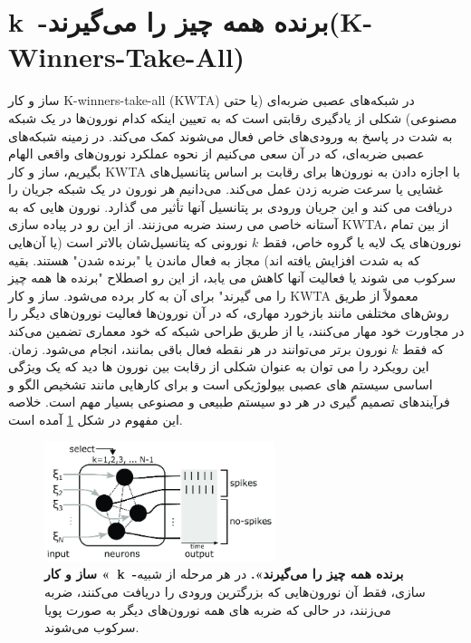 \section{k~-برنده همه چیز را می‌گیرند(K-Winners-Take-All)}
    ساز و کار 
    K-winners-take-all (KWTA) 
    در شبکه‌های عصبی ضربه‌ای
    (یا حتی مصنوعی)
    شکلی از یادگیری رقابتی است که به تعیین اینکه کدام نورون‌ها در یک شبکه به شدت در پاسخ به ورودی‌های خاص فعال می‌شوند کمک می‌کند.
    در زمینه شبکه‌های عصبی ضربه‌ای، که در آن سعی می‌کنیم از نحوه عملکرد نورون‌های واقعی الهام بگیریم، ساز و کار 
    KWTA 
    با اجازه دادن به نورون‌ها برای رقابت بر اساس پتانسیل‌های غشایی یا سرعت ضربه زدن عمل می‌کند. می‌دانیم هر نورون در یک شبکه جریان را دریافت می کند و این جریان ورودی بر پتانسیل آنها تأثیر می گذارد. نورون هایی که به آستانه خاصی می رسند ضربه می‌زنند. از این رو در پیاده سازی 
    KWTA، 
    از بین تمام نورون‌های یک لایه یا گروه خاص، فقط 
    $k$ 
    نورونی که پتانسیل‌شان بالاتر است 
    (یا آن‌هایی که به شدت افزایش یافته اند) 
    مجاز به فعال ماندن یا "برنده شدن" هستند. بقیه سرکوب می شوند یا فعالیت آنها کاهش می یابد، از این رو اصطلاح "برنده ها همه چیز را می گیرند" برای آن به کار برده می‌شود.
    ساز و کار 
    KWTA 
    معمولاً از طریق روش‌های مختلفی مانند بازخورد مهاری، که در آن نورون‌ها فعالیت نورون‌های دیگر را در مجاورت خود مهار می‌کنند، یا از طریق طراحی شبکه که خود معماری تضمین می‌کند که فقط 
    $k$ 
    نورون‌ برتر می‌توانند در هر نقطه فعال باقی بمانند، انجام می‌شود. زمان. این رویکرد را می توان به عنوان شکلی از رقابت بین نورون ها دید که یک ویژگی اساسی سیستم های عصبی بیولوژیکی است و برای کارهایی مانند تشخیص الگو و فرآیندهای تصمیم گیری در هر دو سیستم طبیعی و مصنوعی بسیار مهم است. خلاصه این مفهوم در شکل 
    \ref{fig:k-winners-take-all-schematic}
    آمده است.

    \begin{figure}[!ht]
        \centering
        \includegraphics[width=0.6\textwidth]{images/k-winners-take-all-schematic.png} 
        \captionsetup{width=.7\linewidth}
        \caption{\textbf{ ساز و کار 
        «~k~-برنده همه چیز را می‌گیرند».} در هر مرحله از شبیه سازی، فقط آن نورون‌هایی که بزرگترین ورودی را دریافت می‌کنند، ضربه می‌زنند، در حالی که ضربه های همه نورون‌های دیگر به صورت پویا سرکوب می‌شوند.
        }
        \label{fig:k-winners-take-all-schematic}
    \end{figure}

